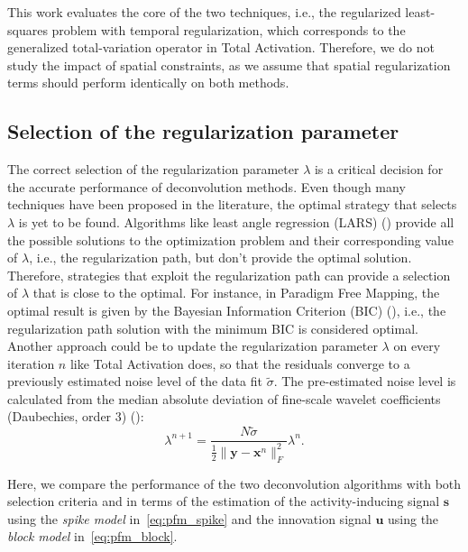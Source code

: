 This work evaluates the core of the two techniques, i.e., the regularized least-squares problem with temporal regularization, which corresponds to the generalized total-variation operator in Total Activation. Therefore, we do not study the impact of spatial constraints, as we assume that spatial regularization terms should perform identically on both methods.

\subsection{Selection of the regularization parameter}
\label{sec:regparam}

The correct selection of the regularization parameter \(\lambda\) is a critical decision for the accurate performance of deconvolution methods. Even though many techniques have been proposed in the literature, the optimal strategy that selects \(\lambda\) is yet to be found. Algorithms like least angle regression (LARS) (\citealt{efron2004LeastAngleRegression}) provide all the possible solutions to the optimization problem and their corresponding value of \(\lambda\), i.e., the regularization path, but don't provide the optimal solution. Therefore, strategies that exploit the regularization path can provide a selection of \(\lambda\) that is close to the optimal. For instance, in Paradigm Free Mapping, the optimal result is given by the Bayesian Information Criterion (BIC) (\citealt{schwarz1978EstimatingDimensionModel}), i.e., the regularization path solution with the minimum BIC is considered optimal. Another approach could be to update the regularization parameter \(\lambda\) on every iteration \(n\) like Total Activation does, so that the residuals converge to a previously estimated noise level of the data fit \(\tilde{\sigma}\). The pre-estimated noise level is calculated from the median absolute deviation of fine-scale wavelet coefficients (Daubechies, order 3) (\citealt{karahanoglu2013TotalActivationFMRI}):
\begin{equation}
    \lambda^{n+1} = \frac{N \tilde{\sigma}}{\frac{1}{2} \| \mathbf{y} - \mathbf{x}^n \|_F^2} \lambda^n.
\label{eq:std}
\end{equation}

Here, we compare the performance of the two deconvolution algorithms with both selection criteria and in terms of the estimation of the activity-inducing signal \(\mathbf{s}\) using the \textit{spike model} in~\eqref{eq:pfm_spike} and the innovation signal \(\mathbf{u}\) using the \textit{block model} in~\eqref{eq:pfm_block}.